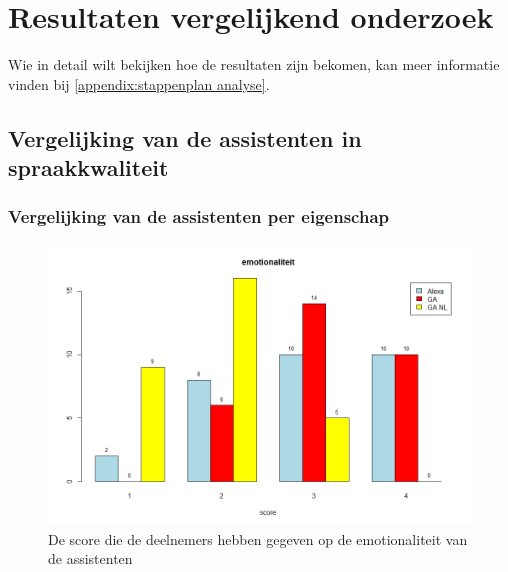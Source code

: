 
\chapter{Resultaten vergelijkend onderzoek}
\label{ch:Resultaten vergelijkend onderzoek}
Wie in detail wilt bekijken hoe de resultaten zijn bekomen, kan meer informatie vinden bij \ref{appendix:stappenplan analyse}.

\section{Vergelijking van de assistenten in spraakkwaliteit}
\label{s:Vergelijking van de assistenten in spraakkwaliteit}

\subsection{Vergelijking van de assistenten per eigenschap}
\label{ss:Vergelijking van de assistenten per eigenschap}

\begin{figure}[h]
    \includegraphics[width=0.9\linewidth]{../onderzoek/onderzoeksresultaten/vergelijking_assistenten_per_eigenschap/barplot/barplot_score_emotionaliteit}
    \caption{De score die de deelnemers hebben gegeven op de emotionaliteit van de assistenten}
    \label{fig:barplot-emotionaliteit}
\end{figure}

